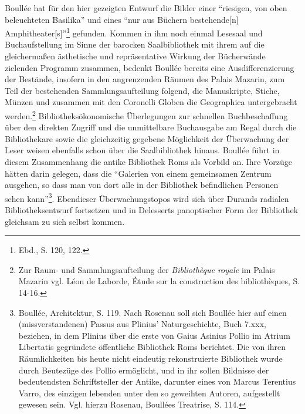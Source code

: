 Boullée hat für den hier gezeigten Entwurf die Bilder einer
\enquote{riesigen, von oben beleuchteten Basilika} und eines
\enquote{nur aus Büchern bestehende{[}n{]}
Amphitheater{[}s{]}}\footnote{Ebd., S. 120, 122.} gefunden. Kommen in
ihm noch einmal Lesesaal und Buchaufstellung im Sinne der barocken
Saalbibliothek mit ihrem auf die gleichermaßen ästhetische und
repräsentative Wirkung der Bücherwände zielenden Programm zusammen,
bedenkt Boullée bereits eine Ausdifferenzierung der Bestände, insofern
in den angrenzenden Räumen des Palais Mazarin, zum Teil der bestehenden
Sammlungsaufteilung folgend, die Manuskripte, Stiche, Münzen und
zusammen mit den Coronelli Globen die Geographica untergebracht
werden.\footnote{Zur Raum- und Sammlungsaufteilung der
  \emph{Bibliothèque royale} im Palais Mazarin vgl. Léon de Laborde,
  Étude sur la construction des bibliothèques, S. 14-16.}
Bibliotheksökonomische Überlegungen zur schnellen Buchbeschaffung über
den direkten Zugriff und die unmittelbare Buchausgabe am Regal durch die
Bibliothekare sowie die gleichzeitig gegebene Möglichkeit der
Überwachung der Leser weisen ebenfalls schon über die Saalbibliothek
hinaus. Boullée führt in diesem Zusammenhang die antike Bibliothek Roms
als Vorbild an. Ihre Vorzüge hätten darin gelegen, dass die
\enquote{Galerien von einem gemeinsamen Zentrum ausgehen, so dass man
von dort alle in der Bibliothek befindlichen Personen sehen
kann}\footnote{Boullée, Architektur, S. 119. Nach Rosenau soll sich
  Boullée hier auf einen (missverstandenen) Passus aus Plinius'
  Naturgeschichte, Buch 7.xxx, beziehen, in dem Plinius über die erste
  von Gaius Asinius Pollio im Atrium Libertatis gegründete öffentliche
  Bibliothek Roms berichtet. Die von ihren Räumlichkeiten bis heute
  nicht eindeutig rekonstruierte Bibliothek wurde durch Beutezüge des
  Pollio ermöglicht, und in ihr sollen Bildnisse der bedeutendsten
  Schriftsteller der Antike, darunter eines von Marcus Terentius Varro,
  des einzigen lebenden unter den so geweihten Autoren, aufgestellt
  gewesen sein. Vgl. hierzu Rosenau, Boullées Treatrise, S. 114.}.
Ebendieser Überwachungstopos wird sich über Durands radialen
Bibliotheksentwurf fortsetzen und in Delesserts panoptischer Form der
Bibliothek gleichsam zu sich selbst kommen.


